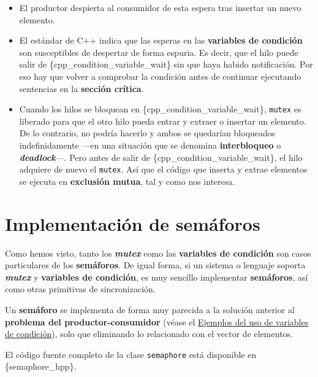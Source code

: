 \begin{itemize}
{  condición} \texttt{no\_empty}.
\item
  El productor despierta al consumidor de esta espera tras insertar un
  nuevo elemento.
\item
  El estándar de C++ indica que las esperas en las \textbf{variables de
  condición} son susceptibles de despertar de forma espuria. Es decir,
  que el hilo puede salir de \{cpp\_condition\_variable\_wait\} sin que
  haya habido notificación. Por eso hay que volver a comprobar la
  condición antes de continuar ejecutando sentencias en la
  \textbf{sección crítica}.
\item
  Cuando los hilos se bloquean en \{cpp\_condition\_variable\_wait\},
  \texttt{mutex} es liberado para que el otro hilo pueda entrar y
  extraer o insertar un elemento. De lo contrario, no podría hacerlo y
  ambos se quedarían bloqueados indefinidamente ---en una situación que
  se denomina \textbf{{}interbloqueo} o \textbf{\emph{deadlock}}---.
  Pero antes de salir de \{cpp\_condition\_variable\_wait\}, el hilo
  adquiere de nuevo el \texttt{mutex}. Así que el código que inserta y
  extrae elementos se ejecuta en \textbf{exclusión mutua}, tal y como
  nos interesa.
\end{itemize}

\section{Implementación de
semáforos}\label{_implementaciuxf3n_de_semuxe1foros}

Como hemos visto, tanto los \textbf{\emph{mutex}} como las
\textbf{variables de condición} son casos particulares de los
\textbf{semáforos}. De igual forma, si un sistema o lenguaje soporta
\textbf{\emph{mutex}} y \textbf{variables de condición}, es muy sencillo
implementar \textbf{semáforos}, así como otras primitivas de
sincronización.

Un \textbf{semáforo} se implementa de forma muy parecida a la solución
anterior al \textbf{problema del productor-consumidor} (véase el
\hyperref[_ejemplos_del_uso_de_variables_de_condiciuxf3n]{Ejemplos del
uso de variables de condición}), solo que eliminando lo relacionado con
el vector de elementos.

El código fuente completo de la clase \texttt{semaphore} está disponible
en \{semaphore\_hpp\}.

